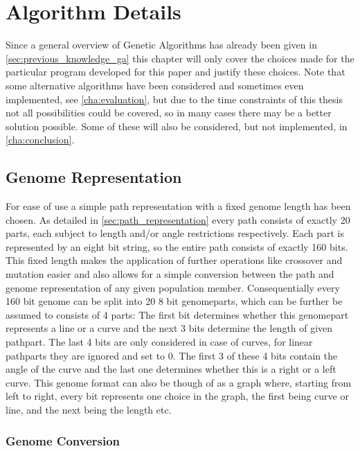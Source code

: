 \chapter{Algorithm Details}
\label{cha:algorithm_details}

Since a general overview of Genetic Algorithms has already been given in \ref{sec:previous_knowledge_ga} this chapter will only cover the choices made for the particular program developed for this paper and justify these choices. Note that some alternative algorithms have been considered and sometimes even implemented, see \ref{cha:evaluation}, but due to the time constraints of this thesis not all possibilities could be covered, so in many cases there may be a better solution possible. Some of these will also be considered, but not implemented, in \ref{cha:conclusion}. 

\section{Genome Representation}
\label{sec:genome_representation}

For ease of use a simple path representation with a fixed genome length has been chosen. As detailed in \ref{sec:path_representation} every path consists of exactly 20 parts, each subject to length and/or angle restrictions respectively. Each part is represented by an eight bit string, so the entire path consists of exactly 160 bits. This fixed length makes the application of further operations like crossover and mutation easier and also allows for a simple conversion between the path and genome representation of any given population member. 
Consequentially every 160 bit genome can be split into 20 8 bit genomeparts, which can be further be assumed to consists of 4 parts: The first bit determines whether this genomepart represents a line or a curve and the next 3 bits determine the length of given pathpart. The last 4 bits are only considered in case of curves, for linear pathparts they are ignored and set to 0. The first 3 of these 4 bits contain the angle of the curve and the last one determines whether this is a right or a left curve. 
This genome format can also be though of as a graph where, starting from left to right, every bit represents one choice in the graph, the first being curve or line, and the next being the length etc. 

\subsection{Genome Conversion}
\label{sec:genome_conversion}

